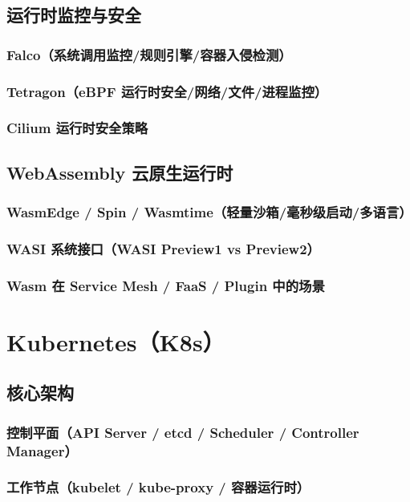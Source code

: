 \documentclass[12pt,UTF8]{ctexbook}
\begin{document}
  \section{运行时监控与安全}
    \subsection{Falco（系统调用监控/规则引擎/容器入侵检测）}
    \subsection{Tetragon（eBPF 运行时安全/网络/文件/进程监控）}
    \subsection{Cilium 运行时安全策略}

  \section{WebAssembly 云原生运行时}
    \subsection{WasmEdge / Spin / Wasmtime（轻量沙箱/毫秒级启动/多语言）}
    \subsection{WASI 系统接口（WASI Preview1 vs Preview2）}
    \subsection{Wasm 在 Service Mesh / FaaS / Plugin 中的场景}


\chapter{Kubernetes（K8s）}
\label{chap:kubernetes}

  \section{核心架构}
    \subsection{控制平面（API Server / etcd / Scheduler / Controller Manager）}
    \subsection{工作节点（kubelet / kube-proxy / 容器运行时）}
\end{document}
